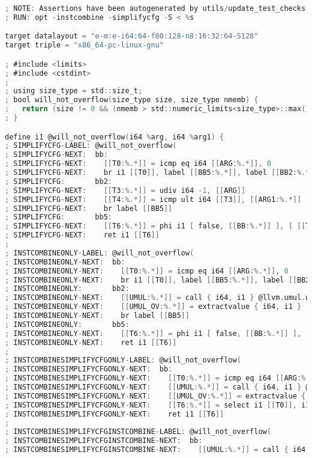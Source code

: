\documentclass[a4paper]{article}
\theoremstyle{definition}
\begin{document}
\begin{lstlisting}[language=C]
; NOTE: Assertions have been autogenerated by utils/update_test_checks.py
; RUN: opt -instcombine -simplifycfg -S < %s 

target datalayout = "e-m:e-i64:64-f80:128-n8:16:32:64-S128"
target triple = "x86_64-pc-linux-gnu"

; #include <limits>
; #include <cstdint>
;
; using size_type = std::size_t;
; bool will_not_overflow(size_type size, size_type nmemb) {
;   return (size != 0 && (nmemb > std::numeric_limits<size_type>::max() / size));
; }

define i1 @will_not_overflow(i64 %arg, i64 %arg1) {
; SIMPLIFYCFG-LABEL: @will_not_overflow(
; SIMPLIFYCFG-NEXT:  bb:
; SIMPLIFYCFG-NEXT:    [[T0:%.*]] = icmp eq i64 [[ARG:%.*]], 0
; SIMPLIFYCFG-NEXT:    br i1 [[T0]], label [[BB5:%.*]], label [[BB2:%.*]]
; SIMPLIFYCFG:       bb2:
; SIMPLIFYCFG-NEXT:    [[T3:%.*]] = udiv i64 -1, [[ARG]]
; SIMPLIFYCFG-NEXT:    [[T4:%.*]] = icmp ult i64 [[T3]], [[ARG1:%.*]]
; SIMPLIFYCFG-NEXT:    br label [[BB5]]
; SIMPLIFYCFG:       bb5:
; SIMPLIFYCFG-NEXT:    [[T6:%.*]] = phi i1 [ false, [[BB:%.*]] ], [ [[T4]], [[BB2]] ]
; SIMPLIFYCFG-NEXT:    ret i1 [[T6]]
;
; INSTCOMBINEONLY-LABEL: @will_not_overflow(
; INSTCOMBINEONLY-NEXT:  bb:
; INSTCOMBINEONLY-NEXT:    [[T0:%.*]] = icmp eq i64 [[ARG:%.*]], 0
; INSTCOMBINEONLY-NEXT:    br i1 [[T0]], label [[BB5:%.*]], label [[BB2:%.*]]
; INSTCOMBINEONLY:       bb2:
; INSTCOMBINEONLY-NEXT:    [[UMUL:%.*]] = call { i64, i1 } @llvm.umul.with.overflow.i64(i64 [[ARG]], i64 [[ARG1:%.*]])
; INSTCOMBINEONLY-NEXT:    [[UMUL_OV:%.*]] = extractvalue { i64, i1 } [[UMUL]], 1
; INSTCOMBINEONLY-NEXT:    br label [[BB5]]
; INSTCOMBINEONLY:       bb5:
; INSTCOMBINEONLY-NEXT:    [[T6:%.*]] = phi i1 [ false, [[BB:%.*]] ], [ [[UMUL_OV]], [[BB2]] ]
; INSTCOMBINEONLY-NEXT:    ret i1 [[T6]]
;
; INSTCOMBINESIMPLIFYCFGONLY-LABEL: @will_not_overflow(
; INSTCOMBINESIMPLIFYCFGONLY-NEXT:  bb:
; INSTCOMBINESIMPLIFYCFGONLY-NEXT:    [[T0:%.*]] = icmp eq i64 [[ARG:%.*]], 0
; INSTCOMBINESIMPLIFYCFGONLY-NEXT:    [[UMUL:%.*]] = call { i64, i1 } @llvm.umul.with.overflow.i64(i64 [[ARG]], i64 [[ARG1:%.*]])
; INSTCOMBINESIMPLIFYCFGONLY-NEXT:    [[UMUL_OV:%.*]] = extractvalue { i64, i1 } [[UMUL]], 1
; INSTCOMBINESIMPLIFYCFGONLY-NEXT:    [[T6:%.*]] = select i1 [[T0]], i1 false, i1 [[UMUL_OV]]
; INSTCOMBINESIMPLIFYCFGONLY-NEXT:    ret i1 [[T6]]
;
; INSTCOMBINESIMPLIFYCFGINSTCOMBINE-LABEL: @will_not_overflow(
; INSTCOMBINESIMPLIFYCFGINSTCOMBINE-NEXT:  bb:
; INSTCOMBINESIMPLIFYCFGINSTCOMBINE-NEXT:    [[UMUL:%.*]] = call { i64, i1 } @llvm.umul.with.overflow.i64(i64 [[ARG:%.*]], i64 [[ARG1:%.*]])

\end{lstlisting}
\end{document}
